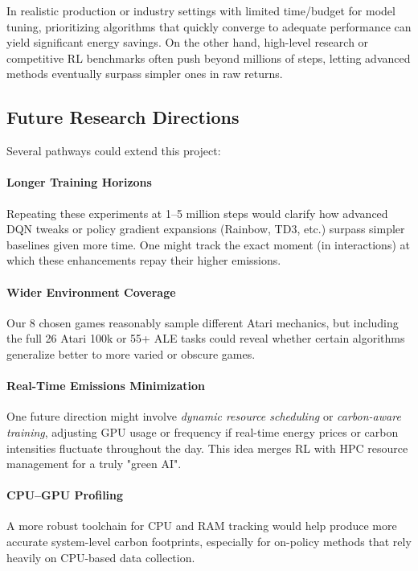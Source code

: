 In realistic production or industry settings with limited time/budget for model tuning, 
prioritizing algorithms that quickly converge to adequate performance can yield 
significant energy savings. On the other hand, high-level research or competitive RL 
benchmarks often push beyond millions of steps, letting advanced methods eventually 
surpass simpler ones in raw returns.

\subsection{Future Research Directions}
\label{subsec:future_research}

Several pathways could extend this project:

\paragraph{Longer Training Horizons}
Repeating these experiments at 1--5 million steps would clarify how advanced DQN tweaks 
or policy gradient expansions (Rainbow, TD3, etc.) surpass simpler baselines given more time. 
One might track the exact moment (in interactions) at which these enhancements repay 
their higher emissions.

\paragraph{Wider Environment Coverage}
Our 8 chosen games reasonably sample different Atari mechanics, but including 
the full 26 Atari 100k or 55+ ALE tasks 
could reveal whether certain algorithms generalize better to more varied or obscure games.

\paragraph{Real-Time Emissions Minimization}
One future direction might involve \emph{dynamic resource scheduling} or 
\emph{carbon-aware training}, adjusting GPU usage or frequency if real-time 
energy prices or carbon intensities fluctuate throughout the day. 
This idea merges RL with HPC resource management for a truly "green AI".

\paragraph{CPU–GPU Profiling}
A more robust toolchain for CPU and RAM tracking
would help produce more accurate system-level carbon footprints, 
especially for on-policy methods that rely heavily on CPU-based data collection.

